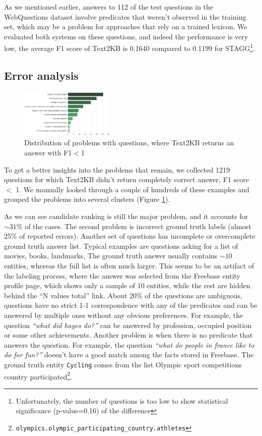 As we mentioned earlier, answers to 112 of the test questions in the WebQuestions dataset involve predicates that weren't observed in the training set, which may be a problem for approaches that rely on a trained lexicon.
We evaluated both systems on these questions, and indeed the performance is very low, \ie the average F1 score of Text2KB is 0.1640 compared to 0.1199 for STAGG\footnote{Unfortunately, the number of questions is too low to show statistical significance (p-value=0.16) of the difference}.

\subsection{Error analysis}
\label{section:analysis:error}

\begin{figure}
\centering
\includegraphics[width=0.4\textwidth]{img/error_analysis}
\vspace{-4mm}
\caption{Distribution of problems with questions, where Text2KB returns an answer with F1$<$1}
\label{fig:error_analysis}
\vspace{-2mm}
\end{figure}

To get a better insights into the problems that remain, we collected 1219 questions for which Text2KB didn't return completely correct answer, \ie F1 score $<$ 1.
We manually looked through a couple of hundreds of these examples and grouped the problems into several clusters (Figure \ref{fig:error_analysis}).

As we can see candidate ranking is still the major problem, and it accounts for $\sim31\%$ of the cases.
The second problem is incorrect ground truth labels (almost 25\% of reported errors).
Another set of questions has incomplete or overcomplete ground truth answer list.
Typical examples are questions asking for a list of movies, books, landmarks, \etc
The ground truth answer usually contains $\sim10$ entities, whereas the full list is often much larger.
This seems to be an artifact of the labeling process, where the answer was selected from the Freebase entity profile page, which shows only a sample of 10 entities, while the rest are hidden behind the ``N values total'' link.
About 20\% of the questions are ambiguous, \ie questions have no strict 1-1 correspondence with any of the predicates and can be answered by multiple ones without any obvious preferences.
For example, the question \textit{``what did hayes do?''} can be answered by profession, occupied position or some other achievements.
Another problem is when there is no predicate that answers the question.
For example, the question \textit{``what do people in france like to do for fun?''} doesn't have a good match among the facts stored in Freebase.
The ground truth entity \texttt{Cycling} comes from the list Olympic sport competitions country participated\footnote{\texttt{olympics.olympic\_participating\_country.athletes}}.

